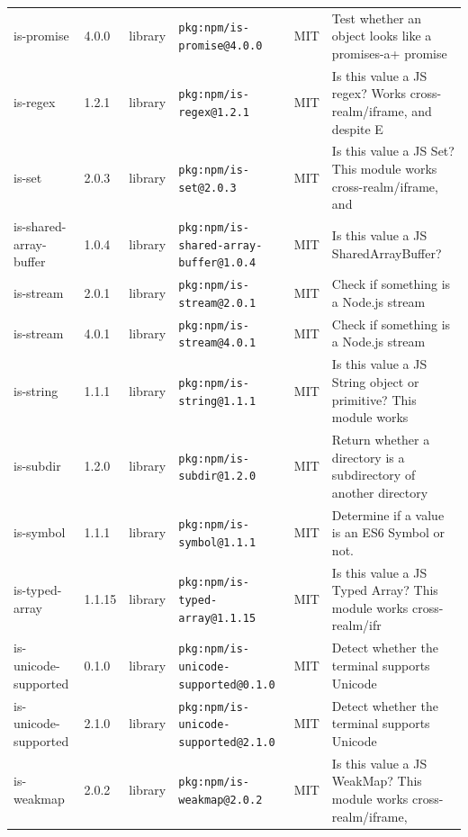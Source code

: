 \documentclass[11pt,a4paper]{article}
\begin{document}
\begin{longtable}{|p{4cm}|p{2cm}|p{1.6cm}|p{5cm}|p{1.5cm}|p{3.5cm}|}
\raggedright is-promise & 4.0.0 & library & \small\texttt{pkg:npm/is-promise@4.0.0} & MIT & \small Test whether an object looks like a promises-a+ promise \\
\raggedright is-regex & 1.2.1 & library & \small\texttt{pkg:npm/is-regex@1.2.1} & MIT & \small Is this value a JS regex? Works cross-realm/iframe, and despite E \\
\raggedright is-set & 2.0.3 & library & \small\texttt{pkg:npm/is-set@2.0.3} & MIT & \small Is this value a JS Set? This module works cross-realm/iframe, and \\
\raggedright is-shared-array-buffer & 1.0.4 & library & \small\texttt{pkg:npm/is-shared-array-buffer@1.0.4} & MIT & \small Is this value a JS SharedArrayBuffer? \\
\raggedright is-stream & 2.0.1 & library & \small\texttt{pkg:npm/is-stream@2.0.1} & MIT & \small Check if something is a Node.js stream \\
\raggedright is-stream & 4.0.1 & library & \small\texttt{pkg:npm/is-stream@4.0.1} & MIT & \small Check if something is a Node.js stream \\
\raggedright is-string & 1.1.1 & library & \small\texttt{pkg:npm/is-string@1.1.1} & MIT & \small Is this value a JS String object or primitive? This module works  \\
\raggedright is-subdir & 1.2.0 & library & \small\texttt{pkg:npm/is-subdir@1.2.0} & MIT & \small Return whether a directory is a subdirectory of another directory \\
\raggedright is-symbol & 1.1.1 & library & \small\texttt{pkg:npm/is-symbol@1.1.1} & MIT & \small Determine if a value is an ES6 Symbol or not. \\
\raggedright is-typed-array & 1.1.15 & library & \small\texttt{pkg:npm/is-typed-array@1.1.15} & MIT & \small Is this value a JS Typed Array? This module works cross-realm/ifr \\
\raggedright is-unicode-supported & 0.1.0 & library & \small\texttt{pkg:npm/is-unicode-supported@0.1.0} & MIT & \small Detect whether the terminal supports Unicode \\
\raggedright is-unicode-supported & 2.1.0 & library & \small\texttt{pkg:npm/is-unicode-supported@2.1.0} & MIT & \small Detect whether the terminal supports Unicode \\
\raggedright is-weakmap & 2.0.2 & library & \small\texttt{pkg:npm/is-weakmap@2.0.2} & MIT & \small Is this value a JS WeakMap? This module works cross-realm/iframe, \\

\end{longtable}
\end{document}
